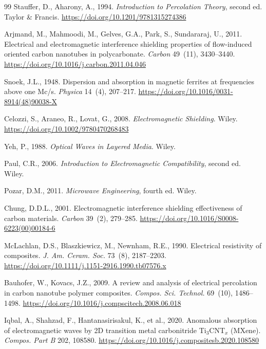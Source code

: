 \documentclass[review,3p,authoryear]{elsarticle}
\begin{document}
\begin{thebibliography}{99}
Stauffer, D., Aharony, A., 1994.
\textit{Introduction to Percolation Theory}, second ed. Taylor \& Francis.
\url{https://doi.org/10.1201/9781315274386}

Arjmand, M., Mahmoodi, M., Gelves, G.A., Park, S., Sundararaj, U., 2011.
Electrical and electromagnetic interference shielding properties of flow-induced oriented carbon nanotubes in polycarbonate.
\textit{Carbon} 49~(11), 3430--3440.
\url{https://doi.org/10.1016/j.carbon.2011.04.046}

Snoek, J.L., 1948.
Dispersion and absorption in magnetic ferrites at frequencies above one Mc/s.
\textit{Physica} 14~(4), 207--217.
\url{https://doi.org/10.1016/0031-8914(48)90038-X}

Celozzi, S., Araneo, R., Lovat, G., 2008.
\textit{Electromagnetic Shielding}. Wiley.
\url{https://doi.org/10.1002/9780470268483}

Yeh, P., 1988.
\textit{Optical Waves in Layered Media}. Wiley.

Paul, C.R., 2006.
\textit{Introduction to Electromagnetic Compatibility}, second ed. Wiley.

Pozar, D.M., 2011.
\textit{Microwave Engineering}, fourth ed. Wiley.

Chung, D.D.L., 2001.
Electromagnetic interference shielding effectiveness of carbon materials.
\textit{Carbon} 39~(2), 279--285.
\url{https://doi.org/10.1016/S0008-6223(00)00184-6}

McLachlan, D.S., Blaszkiewicz, M., Newnham, R.E., 1990.
Electrical resistivity of composites.
\textit{J. Am. Ceram. Soc.} 73~(8), 2187--2203.
\url{https://doi.org/10.1111/j.1151-2916.1990.tb07576.x}

Bauhofer, W., Kovacs, J.Z., 2009.
A review and analysis of electrical percolation in carbon nanotube polymer composites.
\textit{Compos. Sci. Technol.} 69~(10), 1486--1498.
\url{https://doi.org/10.1016/j.compscitech.2008.06.018}

Iqbal, A., Shahzad, F., Hantanasirisakul, K., et al., 2020.
Anomalous absorption of electromagnetic waves by 2D transition metal carbonitride Ti$_3$CNT$_x$ (MXene).
\textit{Compos. Part B} 202, 108580.
\url{https://doi.org/10.1016/j.compositesb.2020.108580}


\end{thebibliography}
\end{document}
